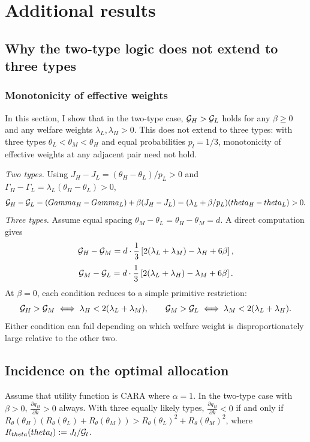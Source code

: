 \documentclass{class}
\begin{document}




\appendix

\section{Additional results}

\subsection{Why the two-type logic does not extend to three types}
\label{app:twovsthree}

\subsubsection{Monotonicity of effective weights}
\label{app:three-nonmonotone-G}
In this section, I show that in the two-type case, $\mathcal{G}_H > \mathcal{G}_L$ holds for any $\beta \geq 0$ and any welfare weights $\lambda_L, \lambda_H > 0$. This does not extend to three types: with three types $\theta_L < \theta_M < \theta_H$ and equal probabilities $p_l = 1/3$, monotonicity of effective weights at any adjacent pair need not hold.

\noindent \textit{Two types.} Using $J_H - J_L = (\theta_H - \theta_L)/p_L > 0$ and $\Gamma_H - \Gamma_L = \lambda_L(\theta_H - \theta_L) > 0$,
\[\mathcal{G}_H - \mathcal{G}_L = (Gamma_H - Gamma_L) + \beta(J_H - J_L) = (\lambda_L + \beta/p_L)(theta_H - theta_L) > 0.\]
\textit{Three types.} Assume equal spacing $\theta_M - \theta_L = \theta_H - \theta_M = d$. A direct computation gives
\[\mathcal{G}_H - \mathcal{G}_M = d\cdot\frac{1}{3}\left[2(\lambda_L + \lambda_M) - \lambda_H + 6\beta\right],\]
\[\mathcal{G}_M - \mathcal{G}_L = d\cdot\frac{1}{3}\left[2(\lambda_L + \lambda_H) - \lambda_M + 6\beta\right].\]
At $\beta = 0$, each condition reduces to a simple primitive restriction:
\[\mathcal{G}_H > \mathcal{G}_M \iff \lambda_H < 2(\lambda_L + \lambda_M), \qquad \mathcal{G}_M > \mathcal{G}_L \iff \lambda_M < 2(\lambda_L + \lambda_H).\]
Either condition can fail depending on which welfare weight is disproportionately large relative to the other two.


\subsection{Incidence on the optimal allocation}
\label{app:three-negative-qH}

Assume that utility function is CARA where $\alpha = 1$. In the two-type case with $\beta > 0$, $\frac{\partial q_H }{\partial k} > 0$ always. With three equally likely types, $\frac{\partial q_H }{\partial k} < 0$ if and only if $R_{\theta}(\theta_H)(R_{\theta}(\theta_L) + R_{\theta}(\theta_M)) > R_{\theta}(\theta_L)^2 + R_{\theta}(\theta_M)^2$, where $R_{theta}(theta_l) := J_l/\mathcal{G}_l$.
\end{document}
